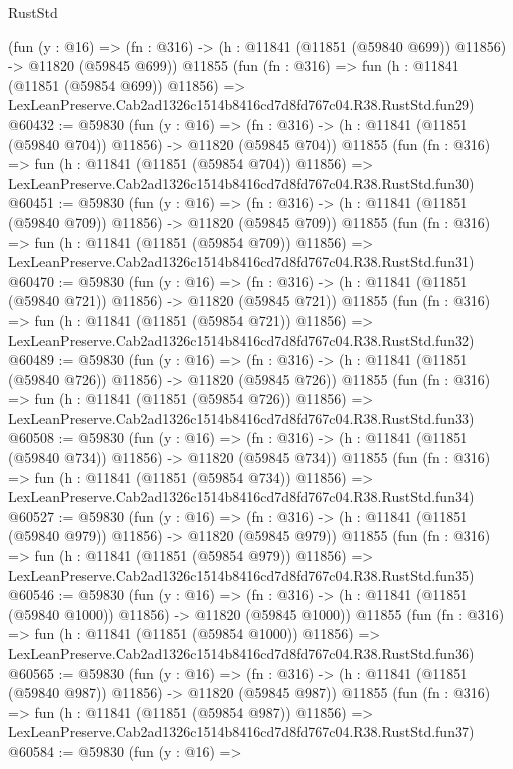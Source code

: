 \begin{lexlean}{RustStd}
\begin{coremodule}
    (fun (y : @16) =>
    (fn : @316) -> (h : @11841 (@11851 (@59840 @699)) @11856) -> @11820 (@59845 @699))
    @11855
    (fun (fn : @316) =>
    fun (h : @11841 (@11851 (@59854 @699)) @11856) =>
    LexLeanPreserve.Cab2ad1326c1514b8416cd7d8fd767c04.R38.RustStd.fun29)
@60432 := @59830
    (fun (y : @16) =>
    (fn : @316) -> (h : @11841 (@11851 (@59840 @704)) @11856) -> @11820 (@59845 @704))
    @11855
    (fun (fn : @316) =>
    fun (h : @11841 (@11851 (@59854 @704)) @11856) =>
    LexLeanPreserve.Cab2ad1326c1514b8416cd7d8fd767c04.R38.RustStd.fun30)
@60451 := @59830
    (fun (y : @16) =>
    (fn : @316) -> (h : @11841 (@11851 (@59840 @709)) @11856) -> @11820 (@59845 @709))
    @11855
    (fun (fn : @316) =>
    fun (h : @11841 (@11851 (@59854 @709)) @11856) =>
    LexLeanPreserve.Cab2ad1326c1514b8416cd7d8fd767c04.R38.RustStd.fun31)
@60470 := @59830
    (fun (y : @16) =>
    (fn : @316) -> (h : @11841 (@11851 (@59840 @721)) @11856) -> @11820 (@59845 @721))
    @11855
    (fun (fn : @316) =>
    fun (h : @11841 (@11851 (@59854 @721)) @11856) =>
    LexLeanPreserve.Cab2ad1326c1514b8416cd7d8fd767c04.R38.RustStd.fun32)
@60489 := @59830
    (fun (y : @16) =>
    (fn : @316) -> (h : @11841 (@11851 (@59840 @726)) @11856) -> @11820 (@59845 @726))
    @11855
    (fun (fn : @316) =>
    fun (h : @11841 (@11851 (@59854 @726)) @11856) =>
    LexLeanPreserve.Cab2ad1326c1514b8416cd7d8fd767c04.R38.RustStd.fun33)
@60508 := @59830
    (fun (y : @16) =>
    (fn : @316) -> (h : @11841 (@11851 (@59840 @734)) @11856) -> @11820 (@59845 @734))
    @11855
    (fun (fn : @316) =>
    fun (h : @11841 (@11851 (@59854 @734)) @11856) =>
    LexLeanPreserve.Cab2ad1326c1514b8416cd7d8fd767c04.R38.RustStd.fun34)
@60527 := @59830
    (fun (y : @16) =>
    (fn : @316) -> (h : @11841 (@11851 (@59840 @979)) @11856) -> @11820 (@59845 @979))
    @11855
    (fun (fn : @316) =>
    fun (h : @11841 (@11851 (@59854 @979)) @11856) =>
    LexLeanPreserve.Cab2ad1326c1514b8416cd7d8fd767c04.R38.RustStd.fun35)
@60546 := @59830
    (fun (y : @16) =>
    (fn : @316) -> (h : @11841 (@11851 (@59840 @1000)) @11856) -> @11820 (@59845 @1000))
    @11855
    (fun (fn : @316) =>
    fun (h : @11841 (@11851 (@59854 @1000)) @11856) =>
    LexLeanPreserve.Cab2ad1326c1514b8416cd7d8fd767c04.R38.RustStd.fun36)
@60565 := @59830
    (fun (y : @16) =>
    (fn : @316) -> (h : @11841 (@11851 (@59840 @987)) @11856) -> @11820 (@59845 @987))
    @11855
    (fun (fn : @316) =>
    fun (h : @11841 (@11851 (@59854 @987)) @11856) =>
    LexLeanPreserve.Cab2ad1326c1514b8416cd7d8fd767c04.R38.RustStd.fun37)
@60584 := @59830
    (fun (y : @16) =>

\end{coremodule}
\end{lexlean}
